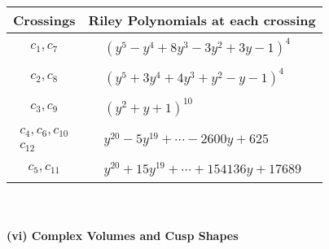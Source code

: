 \documentclass[1p]{elsarticle_modified}
\theoremstyle{definition}
\begin{document}
\begin{tabular}{m{50pt}|m{274pt}}
Crossings & \hspace{64pt}Riley Polynomials at each crossing \\
\hline $$\begin{aligned}c_{1},c_{7}\end{aligned}$$&$\begin{aligned}
&(y^5- y^4+8 y^3-3 y^2+3 y-1)^4
\end{aligned}$\\
\hline $$\begin{aligned}c_{2},c_{8}\end{aligned}$$&$\begin{aligned}
&(y^5+3 y^4+4 y^3+y^2- y-1)^4
\end{aligned}$\\
\hline $$\begin{aligned}c_{3},c_{9}\end{aligned}$$&$\begin{aligned}
&(y^2+y+1)^{10}
\end{aligned}$\\
\hline $$\begin{aligned}c_{4},c_{6},c_{10}\\c_{12}\end{aligned}$$&$\begin{aligned}
&y^{20}-5 y^{19}+\cdots-2600 y+625
\end{aligned}$\\
\hline $$\begin{aligned}c_{5},c_{11}\end{aligned}$$&$\begin{aligned}
&y^{20}+15 y^{19}+\cdots+154136 y+17689
\end{aligned}$\\
\hline
\end{tabular}\\~\\
\newpage\flushleft \textbf{(vi) Complex Volumes and Cusp Shapes}
\end{document}

